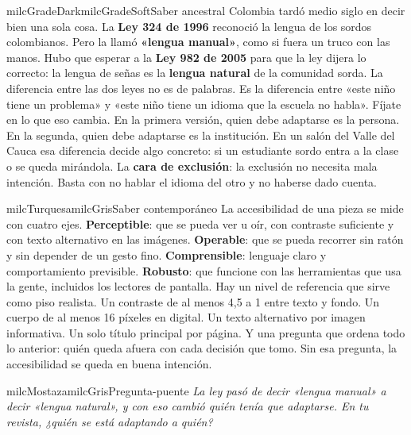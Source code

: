 \documentclass[11pt,letterpaper]{article}
\begin{document}
\begin{softbox}{milcGradeDark}{milcGradeSoft}{Saber ancestral}
Colombia tardó medio siglo en decir bien una sola cosa. La \textbf{Ley 324 de 1996} reconoció la lengua de los sordos colombianos. Pero la llamó \textbf{«lengua manual»}, como si fuera un truco con las manos. Hubo que esperar a la \textbf{Ley 982 de 2005} para que la ley dijera lo correcto: la lengua de señas es la \textbf{lengua natural} de la comunidad sorda. La diferencia entre las dos leyes no es de palabras. Es la diferencia entre «este niño tiene un problema» y «este niño tiene un idioma que la escuela no habla». Fíjate en lo que eso cambia. En la primera versión, quien debe adaptarse es la persona. En la segunda, quien debe adaptarse es la institución. En un salón del Valle del Cauca esa diferencia decide algo concreto: si un estudiante sordo entra a la clase o se queda mirándola. La \textbf{cara de exclusión}: la exclusión no necesita mala intención. Basta con no hablar el idioma del otro y no haberse dado cuenta.\par{}
\end{softbox}

\begin{softbox}{milcTurquesa}{milcGris}{Saber contemporáneo}
La accesibilidad de una pieza se mide con cuatro ejes. \textbf{Perceptible}: que se pueda ver u oír, con contraste suficiente y con texto alternativo en las imágenes. \textbf{Operable}: que se pueda recorrer sin ratón y sin depender de un gesto fino. \textbf{Comprensible}: lenguaje claro y comportamiento previsible. \textbf{Robusto}: que funcione con las herramientas que usa la gente, incluidos los lectores de pantalla. Hay un nivel de referencia que sirve como piso realista. Un contraste de al menos 4,5 a 1 entre texto y fondo. Un cuerpo de al menos 16 píxeles en digital. Un texto alternativo por imagen informativa. Un solo título principal por página. Y una pregunta que ordena todo lo anterior: quién queda afuera con cada decisión que tomo. Sin esa pregunta, la accesibilidad se queda en buena intención.
\end{softbox}

\begin{softbox}{milcMostaza}{milcGris}{Pregunta-puente}
\textit{La ley pasó de decir «lengua manual» a decir «lengua natural», y con eso cambió quién tenía que adaptarse. En tu revista, ¿quién se está adaptando a quién?}
\end{softbox}
\end{document}
